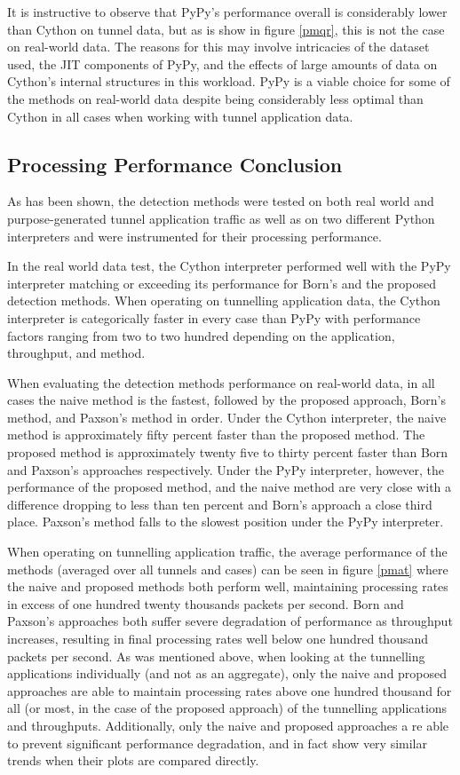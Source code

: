 \documentclass[12pt]{report}
\theoremstyle{remark}
\theoremstyle{definition}
\theoremstyle{definition}
\theoremstyle{definition}
\begin{document}
It is instructive to observe that PyPy's performance overall is considerably
lower than Cython on tunnel data, but as is show in figure \ref{pmqr}, this is
not the case on real-world data. The reasons for this may involve intricacies of
the dataset used, the JIT components of PyPy, and the effects of large amounts
of data on Cython's internal structures in this workload. PyPy is a viable
choice for some of the methods on real-world data despite being considerably
less optimal than Cython in all cases when working with tunnel application data.

\subsection{Processing Performance Conclusion}
As has been shown, the detection methods were tested on both real world and
purpose-generated tunnel application traffic as well as on two different Python
interpreters and were instrumented for their processing performance.

In the real world data test, the Cython interpreter performed well with the PyPy
interpreter matching or exceeding its performance for Born's and the proposed
detection methods. When operating on tunnelling application data, the Cython
interpreter is categorically faster in every case than PyPy with performance
factors ranging from two to two hundred depending on the application,
throughput, and method.

When evaluating the detection methods performance on real-world data, in all
cases the naive method is the fastest, followed by the proposed approach, Born's
method, and Paxson's method in order. Under the Cython interpreter, the naive
method is approximately fifty percent faster than the proposed method. The
proposed method is approximately twenty five to thirty percent faster than Born
and Paxson's approaches respectively. Under the PyPy interpreter, however, the
performance of the proposed method, and the naive method are very close with a
difference dropping to less than ten percent and Born's approach a close third
place. Paxson's method falls to the slowest position under the PyPy interpreter.

When operating on tunnelling application traffic, the average performance of the
methods (averaged over all tunnels and cases) can be seen in figure \ref{pmat} where
the naive and proposed methods both perform well, maintaining processing rates
in excess of one hundred twenty thousands packets per second. Born and Paxson's
approaches both suffer severe degradation of performance as throughput
increases, resulting in final processing rates well below one hundred thousand
packets per second. As was mentioned above, when looking at the tunnelling
applications individually (and not as an aggregate), only the naive and proposed
approaches are able to maintain processing rates above one hundred thousand for
all (or most, in the case of the proposed approach) of the tunnelling
applications and throughputs. Additionally, only the naive and proposed
approaches a re able to prevent significant performance degradation, and in fact
show very similar trends when their plots are compared directly.
\end{document}
